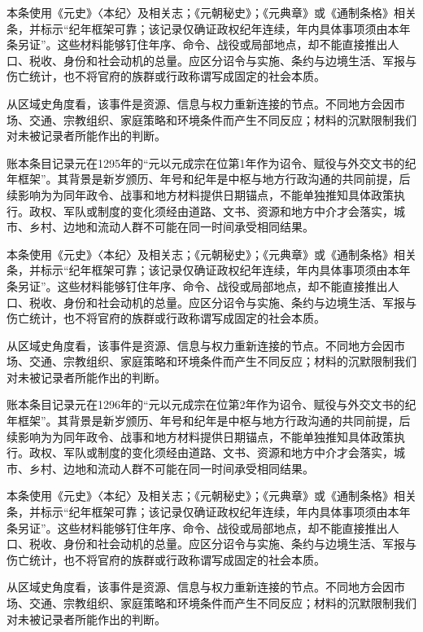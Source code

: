 本条使用《元史》〈本纪〉及相关志；《元朝秘史》；《元典章》或《通制条格》相关条，并标示“纪年框架可靠；该记录仅确证政权纪年连续，年内具体事项须由本年条另证”。这些材料能够钉住年序、命令、战役或局部地点，却不能直接推出人口、税收、身份和社会动机的总量。应区分诏令与实施、条约与边境生活、军报与伤亡统计，也不将官府的族群或行政称谓写成固定的社会本质。

从区域史角度看，该事件是资源、信息与权力重新连接的节点。不同地方会因市场、交通、宗教组织、家庭策略和环境条件而产生不同反应；材料的沉默限制我们对未被记录者所能作出的判断。

账本条目记录元在1295年的“元以元成宗在位第1年作为诏令、赋役与外交文书的纪年框架”。其背景是新岁颁历、年号和纪年是中枢与地方行政沟通的共同前提，后续影响为为同年政令、战事和地方材料提供日期锚点，不能单独推知具体政策执行。政权、军队或制度的变化须经由道路、文书、资源和地方中介才会落实，城市、乡村、边地和流动人群不可能在同一时间承受相同结果。

本条使用《元史》〈本纪〉及相关志；《元朝秘史》；《元典章》或《通制条格》相关条，并标示“纪年框架可靠；该记录仅确证政权纪年连续，年内具体事项须由本年条另证”。这些材料能够钉住年序、命令、战役或局部地点，却不能直接推出人口、税收、身份和社会动机的总量。应区分诏令与实施、条约与边境生活、军报与伤亡统计，也不将官府的族群或行政称谓写成固定的社会本质。

从区域史角度看，该事件是资源、信息与权力重新连接的节点。不同地方会因市场、交通、宗教组织、家庭策略和环境条件而产生不同反应；材料的沉默限制我们对未被记录者所能作出的判断。

账本条目记录元在1296年的“元以元成宗在位第2年作为诏令、赋役与外交文书的纪年框架”。其背景是新岁颁历、年号和纪年是中枢与地方行政沟通的共同前提，后续影响为为同年政令、战事和地方材料提供日期锚点，不能单独推知具体政策执行。政权、军队或制度的变化须经由道路、文书、资源和地方中介才会落实，城市、乡村、边地和流动人群不可能在同一时间承受相同结果。

本条使用《元史》〈本纪〉及相关志；《元朝秘史》；《元典章》或《通制条格》相关条，并标示“纪年框架可靠；该记录仅确证政权纪年连续，年内具体事项须由本年条另证”。这些材料能够钉住年序、命令、战役或局部地点，却不能直接推出人口、税收、身份和社会动机的总量。应区分诏令与实施、条约与边境生活、军报与伤亡统计，也不将官府的族群或行政称谓写成固定的社会本质。

从区域史角度看，该事件是资源、信息与权力重新连接的节点。不同地方会因市场、交通、宗教组织、家庭策略和环境条件而产生不同反应；材料的沉默限制我们对未被记录者所能作出的判断。

